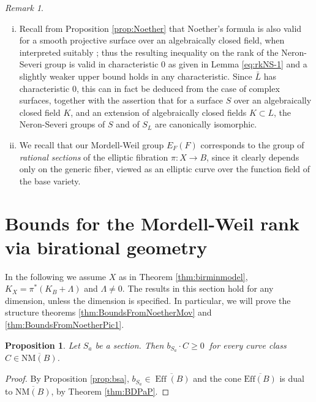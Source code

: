\documentclass[11pt]{amsart}
\newtheorem{proposition}[theorem]{Proposition}
\theoremstyle{definition}
\theoremstyle{definition}
\theoremstyle{remark}
\newtheorem{remark}[theorem]{Remark}
\theoremstyle{remark}
\theoremstyle{definition}
\theoremstyle{conjecture}
\begin{document}
\begin{remark}\begin{enumerate}[(i)]
\item Recall from Proposition \ref{prop:Noether} that Noether's formula
is also valid for a smooth projective surface over an algebraically closed field,
when interpreted suitably \cite{PieneNoether};  thus the resulting inequality on the rank of the Neron-Severi group is valid in characteristic 0 as given in  Lemma \ref{eq:rkNS-1} and a slightly weaker upper bound holds in any characteristic.
Since $\bar{L}$ has characteristic $0$,
this can in fact be deduced from the case of complex surfaces,
together with the assertion that for a surface $S$ over an algebraically closed field $K$,
and an extension of algebraically closed fields $K\subset L$,
the Neron-Severi groups of $S$ and of $S_L$ are canonically isomorphic.
\item  
We recall that our Mordell-Weil group $E_F(F)$ corresponds to
the group of {\em rational sections} of the elliptic fibration
$\pi:X\to B$, since it clearly depends only on the generic fiber,
viewed as an elliptic curve  over the function field of the base
variety. 

\end{enumerate}
\end{remark}
 
 

 


\section{
Bounds for the Mordell-Weil rank via birational geometry
} \label{sec:geomproof}

\medskip


In the following we assume  $X$ as in Theorem \ref{thm:birminmodel}, 
$K_X = \pi^\ast(K_B + \Lambda)$ and $\Lambda \neq 0$.
The results in this
section hold for any dimension, unless the dimension is specified.
{In particular, we will prove the structure theorems \ref{thm:BoundsFromNoetherMov} and 
\ref{thm:BoundsFromNoetherPic1}.}

\begin{proposition}\label{prop:SectionMovableCurveInt}
	Let $S_a$ be a section.
	Then $
		b_{S_a}\cdot C \ge 0 \ 
		$
     for every curve class $C\in \overline{\mathrm{NM}(B)}$.

\end{proposition}

\begin{proof}  By Proposition \ref{prop:bsa}, $b_{S_a} \in \overline{\operatorname{Eff}(B)}$ and  the cone  $\overline{\mathrm{Eff}(B)}$ is dual to $\overline{\mathrm{NM}(B)}$, by Theorem \ref{thm:BDPaP}.\end{proof}
\end{document}
